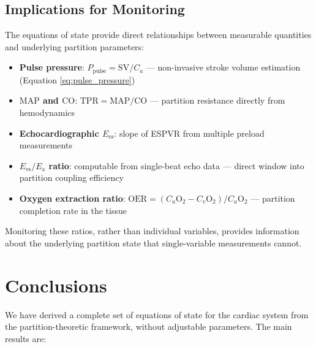 \documentclass[10pt,twocolumn,a4paper]{article}
\theoremstyle{remark}
\newcommand{\Ees}{E_{\mathrm{es}}}
\newcommand{\Ea}{E_{\mathrm{a}}}
\newcommand{\CO}{\mathrm{CO}}
\newcommand{\SV}{\mathrm{SV}}
\newcommand{\MAP}{\mathrm{MAP}}
\newcommand{\TPR}{\mathrm{TPR}}
\begin{document}
\subsection{Implications for Monitoring}

The equations of state provide direct relationships between measurable quantities and underlying partition parameters:

\begin{itemize}
    \item \textbf{Pulse pressure}: $P_{\mathrm{pulse}} = \SV / C_a$ — non-invasive stroke volume estimation (Equation \ref{eq:pulse_pressure})
    \item \textbf{$\MAP$ and $\CO$}: $\TPR = \MAP/\CO$ — partition resistance directly from hemodynamics
    \item \textbf{Echocardiographic $\Ees$}: slope of ESPVR from multiple preload measurements
    \item \textbf{$\Ees/\Ea$ ratio}: computable from single-beat echo data \cite{chen2001noninvasive} — direct window into partition coupling efficiency
    \item \textbf{Oxygen extraction ratio}: $\mathrm{OER} = (C_a\mathrm{O}_2 - C_v\mathrm{O}_2)/C_a\mathrm{O}_2$ — partition completion rate in the tissue
\end{itemize}

Monitoring these ratios, rather than individual variables, provides information about the underlying partition state that single-variable measurements cannot.

\section{Conclusions}
\label{sec:conclusions}

We have derived a complete set of equations of state for the cardiac system from the partition-theoretic framework, without adjustable parameters. The main results are:
\end{document}
